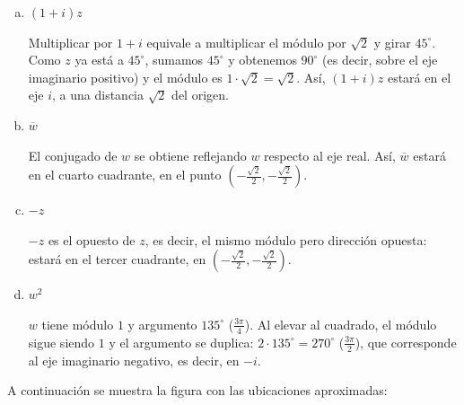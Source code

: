 \begin{prob}
\begin{myproof}
\begin{enumerate}[a)]
\item $(1+i)z$

Multiplicar por $1+i$ equivale a multiplicar el módulo por $\sqrt{2}$ y girar $45^\circ$. Como $z$ ya está a $45^\circ$, sumamos $45^\circ$ y obtenemos $90^\circ$ (es decir, sobre el eje imaginario positivo) y el módulo es $1 \cdot \sqrt{2} = \sqrt{2}$. Así, $(1+i)z$ estará en el eje $i$, a una distancia $\sqrt{2}$ del origen.

\item $\overline{w}$

El conjugado de $w$ se obtiene reflejando $w$ respecto al eje real. Así, $\overline{w}$ estará en el cuarto cuadrante, en el punto $(-\frac{\sqrt{2}}{2}, -\frac{\sqrt{2}}{2})$.

\item $-z$

$-z$ es el opuesto de $z$, es decir, el mismo módulo pero dirección opuesta: estará en el tercer cuadrante, en $(-\frac{\sqrt{2}}{2}, -\frac{\sqrt{2}}{2})$.

\item $w^2$

$w$ tiene módulo $1$ y argumento $135^\circ$ ($\frac{3\pi}{4}$). Al elevar al cuadrado, el módulo sigue siendo $1$ y el argumento se duplica: $2 \cdot 135^\circ = 270^\circ$ ($\frac{3\pi}{2}$), que corresponde al eje imaginario negativo, es decir, en $-i$.
\end{enumerate}

A continuación se muestra la figura con las ubicaciones aproximadas:

\begin{center}
\end{center}
\end{myproof}
\end{prob}

